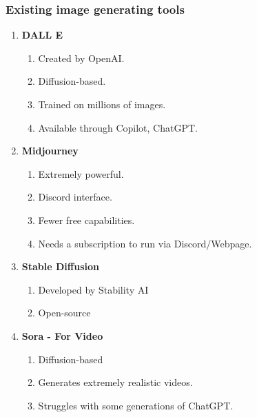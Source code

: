 \subsubsection*{Existing image generating tools}
\begin{enumerate}
    \item \textbf{DALL \cdot E}
    \begin{enumerate} [\ding{109}]
        \item Created by OpenAI.
        \item Diffusion-based.
        \item Trained on millions of images.
        \item Available through Copilot, ChatGPT.
    \end{enumerate}
    \item \textbf{Midjourney}
    \begin{enumerate} [\ding{109}]
        \item Extremely powerful.
        \item Discord interface.
        \item Fewer free capabilities.
        \item Needs a subscription to run via Discord/Webpage.
    \end{enumerate}
    \item \textbf{Stable Diffusion}
    \begin{enumerate} [\ding{109}]
        \item Developed by Stability AI
        \item Open-source
    \end{enumerate}
    \item \textbf{Sora - For Video}
    \begin{enumerate} [\ding{109}]
        \item Diffusion-based
        \item Generates extremely realistic videos.
        \item Struggles with some generations of ChatGPT.
    \end{enumerate}
\end{enumerate}


